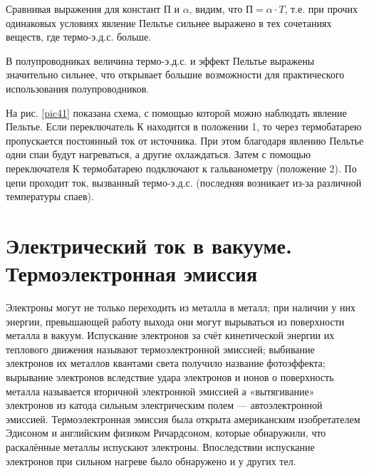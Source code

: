 \documentclass[a4paper,10pt]{book}
\begin{document}
Сравнивая выражения для констант П и $\alpha$, видим, что $\text{П}=\alpha\cdot T$, т.е. при прочих одинаковых условиях явление Пельтье сильнее выражено в тех сочетаниях веществ, где термо-э.д.с. больше.

В полупроводниках величина термо-э.д.с. и эффект Пельтье выражены значительно сильнее, что открывает большие возможности для практического использования полупроводников.

На рис. \ref{pic41} показана схема, с помощью которой можно наблюдать явление Пельтье. Если переключатель К находится в положении 1, то через термобатарею пропускается постоянный ток от источника. При этом благодаря явлению Пельтье одни спаи будут нагреваться, а другие охлаждаться. Затем с помощью переключателя К термобатарею подключают к гальванометру (положение 2). По цепи проходит ток, вызванный термо-э.д.с. (последняя возникает из-за различной температуры спаев).

\chapter{Электрический ток в вакууме. Термоэлектронная эмиссия}
Электроны могут не только переходить из металла в металл; при наличии у них энергии, превышающей работу выхода они могут вырываться из поверхности металла в вакуум. Испускание электронов за счёт кинетической энергии их теплового движения называют термоэлектронной эмиссией; выбивание электронов их металлов квантами света получило название фотоэффекта; вырывание электронов вследствие удара электронов и ионов о поверхность металла называется вторичной электронной эмиссией а «вытягивание» электронов из катода сильным электрическим полем — автоэлектронной эмиссией. Термоэлектронная эмиссия была открыта американским изобретателем Эдисоном и английским физиком Ричардсоном, которые обнаружили, что раскалённые металлы испускают электроны. Впоследствии испускание электронов при сильном нагреве было обнаружено и у других тел.
\end{document}
